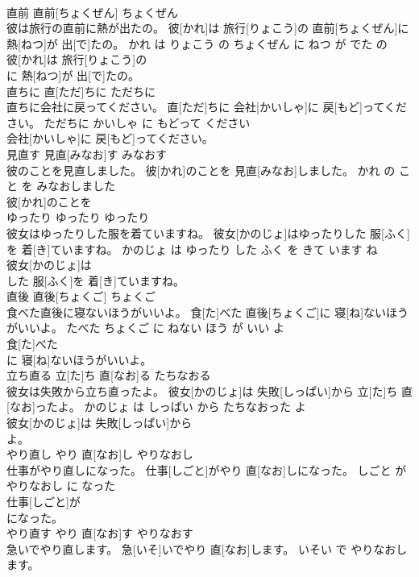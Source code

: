 \documentclass[8pt]{extreport}
\begin{document}
\begin{CJK}{UTF8}{min}
\\	直前	直前[ちょくぜん]	ちょくぜん	
\\	彼は旅行の直前に熱が出たの。	彼[かれ]は 旅行[りょこう]の 直前[ちょくぜん]に 熱[ねつ]が 出[で]たの。	かれ は りょこう の ちょくぜん に ねつ が でた の	
\\	彼[かれ]は 旅行[りょこう]の
\\	に 熱[ねつ]が 出[で]たの。			
\\	直ちに	直[ただ]ちに	ただちに	
\\	直ちに会社に戻ってください。	直[ただ]ちに 会社[かいしゃ]に 戻[もど]ってください。	ただちに かいしゃ に もどって ください	
\\	会社[かいしゃ]に 戻[もど]ってください。			
\\	見直す	見直[みなお]す	みなおす	
\\	彼のことを見直しました。	彼[かれ]のことを 見直[みなお]しました。	かれ の こと を みなおしました	
\\	彼[かれ]のことを
\\	ゆったり	ゆったり	ゆったり	
\\	彼女はゆったりした服を着ていますね。	彼女[かのじょ]はゆったりした 服[ふく]を 着[き]ていますね。	かのじょ は ゆったり した ふく を きて います ね	
\\	彼女[かのじょ]は
\\	した 服[ふく]を 着[き]ていますね。			
\\	直後	直後[ちょくご]	ちょくご	
\\	食べた直後に寝ないほうがいいよ。	食[た]べた 直後[ちょくご]に 寝[ね]ないほうがいいよ。	たべた ちょくご に ねない ほう が いい よ	
\\	食[た]べた
\\	に 寝[ね]ないほうがいいよ。			
\\	立ち直る	立[た]ち 直[なお]る	たちなおる	
\\	彼女は失敗から立ち直ったよ。	彼女[かのじょ]は 失敗[しっぱい]から 立[た]ち 直[なお]ったよ。	かのじょ は しっぱい から たちなおった よ	
\\	彼女[かのじょ]は 失敗[しっぱい]から
\\	よ。			
\\	やり直し	やり 直[なお]し	やりなおし	
\\	仕事がやり直しになった。	仕事[しごと]がやり 直[なお]しになった。	しごと が やりなおし に なった	
\\	仕事[しごと]が
\\	になった。			
\\	やり直す	やり 直[なお]す	やりなおす	
\\	急いでやり直します。	急[いそ]いでやり 直[なお]します。	いそい で やりなおします。	

\end{CJK}
\end{document}
